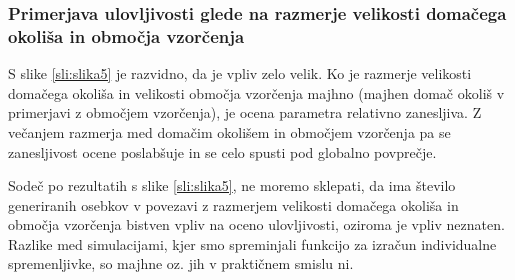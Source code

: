 \subsubsection[\bfseries Primerjava ulovljivosti glede na razmerje velikosti domačega okoliša in območja vzorčenja]{Primerjava ulovljivosti glede na razmerje velikosti domačega okoliša in območja vzorčenja}
S slike \ref{sli:slika5} je razvidno, da je vpliv zelo velik. Ko je razmerje velikosti domačega okoliša in velikosti območja vzorčenja majhno (majhen domač okoliš v primerjavi z območjem vzorčenja), je ocena parametra relativno zanesljiva. Z večanjem razmerja med domačim okolišem in območjem vzorčenja pa se zanesljivost ocene poslabšuje in se celo spusti pod globalno povprečje.

Sodeč po rezultatih s slike \ref{sli:slika5}, ne moremo sklepati, da ima število generiranih osebkov v povezavi z razmerjem velikosti domačega okoliša in območja vzorčenja bistven vpliv na oceno ulovljivosti, oziroma je vpliv neznaten. Razlike med simulacijami, kjer smo spreminjali funkcijo za izračun individualne spremenljivke, so majhne oz. jih v praktičnem smislu ni.

